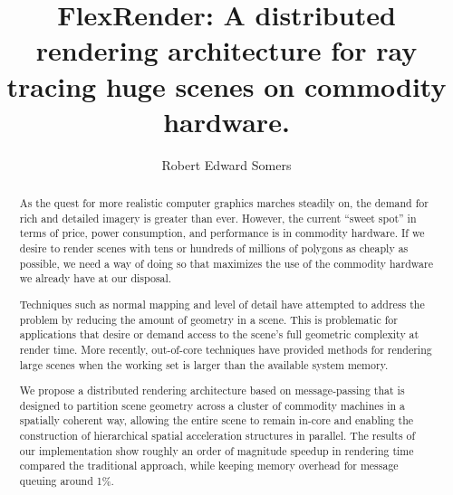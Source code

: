 \documentclass[12pt]{ucthesis}
\begin{document}

\title{FlexRender: A distributed rendering architecture for ray tracing huge
scenes on commodity hardware.}
\author{Robert Edward Somers}
  
 
     



\maketitle

\begin{frontmatter}

\copyrightpage

\committeemembershippage

\begin{abstract}

As the quest for more realistic computer graphics marches steadily on, the
demand for rich and detailed imagery is greater than ever. However, the current
``sweet spot'' in terms of price, power consumption, and performance is in
commodity hardware. If we desire to render scenes with tens or hundreds of millions
of polygons as cheaply as possible, we need a way of doing so that maximizes
the use of the commodity hardware we already have at our disposal.

Techniques such as normal mapping and level of detail have attempted to address
the problem by reducing the amount of geometry in a scene. This is problematic
for applications that desire or demand access to the scene's full geometric
complexity at render time. More recently, out-of-core techniques have provided
methods for rendering large scenes when the working set is larger than the
available system memory.

We propose a distributed rendering architecture based on message-passing that
is designed to partition scene geometry across a cluster of commodity machines
in a spatially coherent way, allowing the entire scene to remain in-core and
enabling the construction of hierarchical spatial acceleration structures in
parallel. The results of our implementation show roughly an order of magnitude
speedup in rendering time compared the traditional approach, while keeping
memory overhead for message queuing around 1\%.

\end{abstract}





\tableofcontents


\listoftables

\listoffigures

\end{frontmatter}
\end{document}
